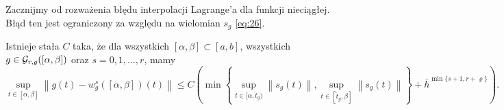 \documentclass[oik, pdftex, robocza, man]{mgrwms}
\begin{document}
    Zacznijmy od rozważenia błędu interpolacji Lagrange'a dla funkcji nieciągłej. Błąd ten jest ograniczony za względu na wielomian $s_{g}$ \eqref{eq:26}.

    \begin{lemma} \label{lem:1:2014}
        Istnieje stała $C$ taka, że dla wszystkich $[\alpha, \beta] \subset [a, b]$, wszystkich $g \in \mathcal{G}_{r,\varrho}([\alpha,\beta])$ oraz $s=0,1,\dots,r$, mamy
        \begin{equation*}
            \sup _{t \in[\alpha, \beta]}\left\|g(t)-w_{g}^{s}([\alpha, \beta])(t)\right\| \leq 
                C\left(\min \left\{\sup_{t \in[\alpha, \hat{t}_{g})}\left\|s_{g}(t)\right\|, \sup _{t \in [\hat{t}_{g}, \beta]}\left\|s_{g}(t)\right\|\right\}+\bar{h}^{\min \{s+1, r+\varrho\}}\right).
        \end{equation*}
    \end{lemma}
\end{document}
